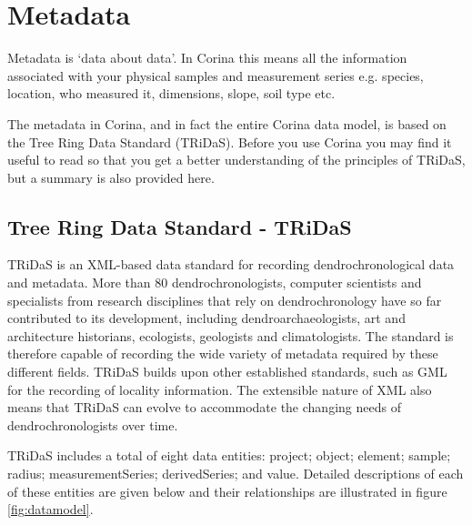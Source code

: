 \chapter{Metadata}
\label{txt:metadata}
Metadata is `data about data'. In Corina this means all the information associated with your physical samples and measurement series e.g. species, location, who measured it, dimensions, slope, soil type etc.

The metadata in Corina, and in fact the entire Corina data model, is based on the Tree Ring Data Standard (TRiDaS). Before you use Corina you may find it useful to read \citet{tridas} so that you get a better understanding of the principles of TRiDaS, but a summary is also provided here.

\section{Tree Ring Data Standard - TRiDaS}
TRiDaS is an XML-based data standard for recording dendrochronological data and metadata. More than 80 dendrochronologists, computer scientists and specialists from research disciplines that rely on dendrochronology have so far contributed to its development, including dendroarchaeologists, art and architecture historians, ecologists, geologists and climatologists.  The standard is therefore capable of recording the wide variety of metadata required by these different fields. TRiDaS builds upon other established standards, such as GML for the recording of locality information.  The extensible nature of XML also means that TRiDaS can evolve to accommodate the changing needs of dendrochronologists over time.  

TRiDaS includes a total of eight data entities: project; object; element; sample; radius; measurementSeries; derivedSeries; and value.  Detailed descriptions of each of these entities are given below and their relationships are illustrated in figure \ref{fig:datamodel}.

